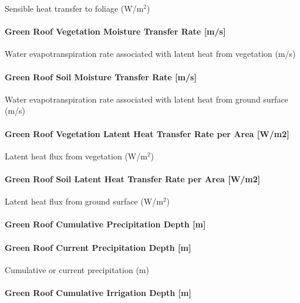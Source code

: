 Sensible heat transfer to foliage (W/m\(^{2}\))

\paragraph{Green Roof Vegetation Moisture Transfer Rate {[}m/s{]}}\label{green-roof-vegetation-moisture-transfer-rate-ms}

Water evapotranspiration rate associated with latent heat from vegetation (m/s)

\paragraph{Green Roof Soil Moisture Transfer Rate {[}m/s{]}}\label{green-roof-soil-moisture-transfer-rate-ms}

Water evapotranspiration rate associated with latent heat from ground surface (m/s)

\paragraph{Green Roof Vegetation Latent Heat Transfer Rate per Area {[}W/m2{]}}\label{green-roof-vegetation-latent-heat-transfer-rate-per-area-wm2}

Latent heat flux from vegetation (W/m\(^{2}\))

\paragraph{Green Roof Soil Latent Heat Transfer Rate per Area {[}W/m2{]}}\label{green-roof-soil-latent-heat-transfer-rate-per-area-wm2}

Latent heat flux from ground surface (W/m\(^{2}\))

\paragraph{Green Roof Cumulative Precipitation Depth {[}m{]}}\label{green-roof-cumulative-precipitation-depth-m}

\paragraph{Green Roof Current Precipitation Depth {[}m{]}}\label{green-roof-current-precipitation-depth-m}

Cumulative or current precipitation (m)

\paragraph{Green Roof Cumulative Irrigation Depth {[}m{]}}\label{green-roof-cumulative-irrigation-depth-m}

